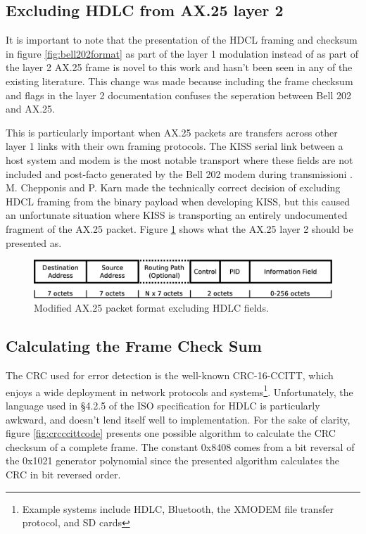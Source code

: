 \documentclass[12pt,letterpaper]{article}
\begin{document}
\begin{itemize}
\end{itemize}

\subsection{Excluding HDLC from AX.25 layer 2}

It is important to note that the presentation of the HDCL framing
and checksum
in figure \ref{fig:bell202format} as part of the layer 1 modulation 
instead of as part of the layer 2 AX.25 frame is 
novel to this work and hasn't been seen in any of the existing literature.
This change was made because including the frame checksum and flags
in the layer 2 documentation confuses the seperation between Bell 202 
and AX.25. 

This is particularly important when AX.25 packets are transfers across 
other layer 1 links with their own framing protocols.
The KISS serial link between a host system and modem is the most notable
transport where these fields are not included and post-facto generated by the
Bell 202 modem during transmissioni \cite{KISSspec}.
M. Chepponis and P. Karn made the technically correct decision of excluding 
HDCL framing from the binary payload when developing KISS, but this caused
an unfortunate situation where KISS is transporting an entirely
undocumented fragment of the AX.25 packet. Figure \ref{fig:ax25format} 
shows what the AX.25 layer 2 should be presented as.

\begin{figure}
	\centering
	\includegraphics[width=1.0\textwidth]{src/dia/ax25}
	\caption{Modified AX.25 packet format excluding HDLC fields.}
	\label{fig:ax25format}
\end{figure}

\subsection{Calculating the Frame Check Sum}
\label{calcfcs}


The CRC used for error detection is the well-known CRC-16-CCITT, which
enjoys a wide deployment in network protocols and 
systems\footnote{Example systems include HDLC, Bluetooth, the XMODEM file 
transfer protocol, and SD cards}.
Unfortunately, the language used in \S4.2.5 of the ISO specification for
HDLC \cite{iso13239} is particularly awkward, 
and doesn't lend itself well to implementation.
For the sake of clarity, figure \ref{fig:crcccittcode} 
presents one possible algorithm to
calculate the CRC checksum of a complete frame.
The constant 0x8408 comes from a bit reversal of the 0x1021 generator polynomial
since the presented algorithm calculates the CRC in bit reversed order.
\end{document}
